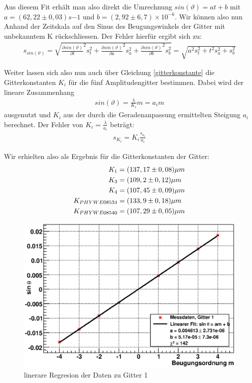 \documentclass[12pt]{article}
\begin{document}
Aus diesem Fit erhält man also direkt die Umrechnung $sin(\vartheta)=at+b$ mit $a=(62,22\pm 0,03)s{-1}$ und $b=(2,92\pm 6,7)\times 10^{-6}$. Wir können also nun Anhand der Zeitskala auf den Sinus des Beugungswinkels der Gitter mit unbekanntem K rückschliessen. Der Fehler hierfür ergibt sich zu:
\begin{align}
 s_{sin(\vartheta)} = \sqrt{\frac{\partial sin(\vartheta)}{\partial t}^2s_t^2 + \frac{\partial sin(\vartheta)}{\partial a}^2s_a^2 + \frac{\partial sin(\vartheta)}{\partial b}^2s_b^2} = \sqrt{a^2s_t^2+t^2s_a^2+s_b^2}
\end{align}

Weiter lassen sich also nun auch über Gleichung \ref{gitterkonstante} die Gitterkonstanten $K_i$ für die fünf Amplitudengitter bestimmen. Dabei wird der lineare Zusammenhang 
\begin{align}
 sin(\vartheta) = \frac{\lambda}{K_i}m = a_im
\end{align}
ausgenutzt und $K_i$ aus der durch die Geradenanpassung ermittelten Steigung $a_i$ berechnet. Der Fehler von $K_i = \frac{\lambda}{a_i}$ beträgt:
\begin{align}
 s_{K_i}=K_i\frac{s_{a_i}}{a_i}
\end{align}

Wir erhielten also als Ergebnis für die Gitterkonstanten der Gitter:
\begin{align}
 \notag
K_1 &= ( 137,17 \pm 0,08)\mu m \\
 \notag
K_3 &= ( 109,2\pm 0,12)\mu m \\
 \notag
K_4 &= ( 107,45\pm 0,09)\mu m \\
 \notag
K_{PHYWE08534} &= ( 133,9 \pm 0,18)\mu m \\
 \notag
K_{PHYWE08540} &= ( 107,29 \pm 0,05)\mu m
\end{align}

\begin{figure}[H]  
\centering
\includegraphics[width=0.7\linewidth]{pictures/gitter1.eps}
\caption{linerare Regresion der Daten zu Gitter 1}
\end{figure}
\end{document}
